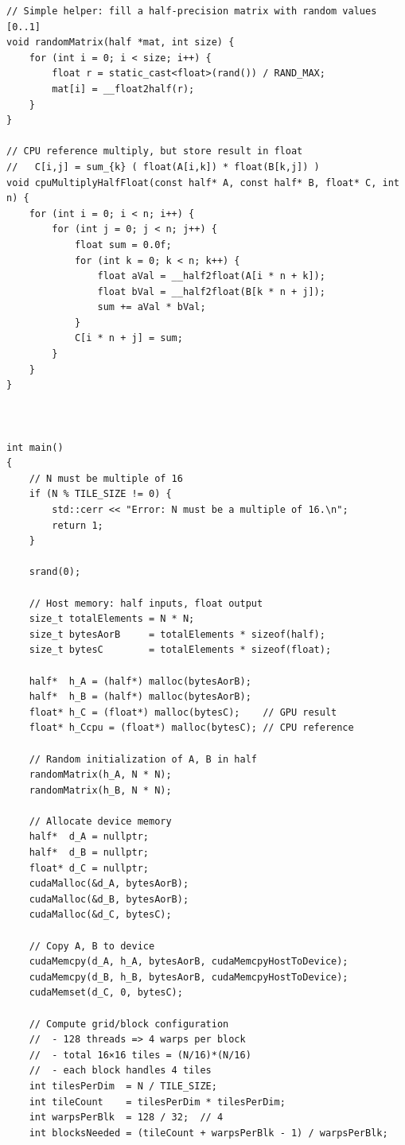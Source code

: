 \begin{lstlisting}
// Simple helper: fill a half-precision matrix with random values [0..1]
void randomMatrix(half *mat, int size) {
    for (int i = 0; i < size; i++) {
        float r = static_cast<float>(rand()) / RAND_MAX;
        mat[i] = __float2half(r);
    }
}

// CPU reference multiply, but store result in float
//   C[i,j] = sum_{k} ( float(A[i,k]) * float(B[k,j]) )
void cpuMultiplyHalfFloat(const half* A, const half* B, float* C, int n) {
    for (int i = 0; i < n; i++) {
        for (int j = 0; j < n; j++) {
            float sum = 0.0f;
            for (int k = 0; k < n; k++) {
                float aVal = __half2float(A[i * n + k]);
                float bVal = __half2float(B[k * n + j]);
                sum += aVal * bVal;
            }
            C[i * n + j] = sum;
        }
    }
}



int main()
{
    // N must be multiple of 16
    if (N % TILE_SIZE != 0) {
        std::cerr << "Error: N must be a multiple of 16.\n";
        return 1;
    }

    srand(0);

    // Host memory: half inputs, float output
    size_t totalElements = N * N;
    size_t bytesAorB     = totalElements * sizeof(half);
    size_t bytesC        = totalElements * sizeof(float);

    half*  h_A = (half*) malloc(bytesAorB);
    half*  h_B = (half*) malloc(bytesAorB);
    float* h_C = (float*) malloc(bytesC);    // GPU result
    float* h_Ccpu = (float*) malloc(bytesC); // CPU reference

    // Random initialization of A, B in half
    randomMatrix(h_A, N * N);
    randomMatrix(h_B, N * N);

    // Allocate device memory
    half*  d_A = nullptr;
    half*  d_B = nullptr;
    float* d_C = nullptr;
    cudaMalloc(&d_A, bytesAorB);
    cudaMalloc(&d_B, bytesAorB);
    cudaMalloc(&d_C, bytesC);

    // Copy A, B to device
    cudaMemcpy(d_A, h_A, bytesAorB, cudaMemcpyHostToDevice);
    cudaMemcpy(d_B, h_B, bytesAorB, cudaMemcpyHostToDevice);
    cudaMemset(d_C, 0, bytesC);

    // Compute grid/block configuration
    //  - 128 threads => 4 warps per block
    //  - total 16×16 tiles = (N/16)*(N/16)
    //  - each block handles 4 tiles
    int tilesPerDim  = N / TILE_SIZE;
    int tileCount    = tilesPerDim * tilesPerDim;
    int warpsPerBlk  = 128 / 32;  // 4
    int blocksNeeded = (tileCount + warpsPerBlk - 1) / warpsPerBlk;


\end{lstlisting}
